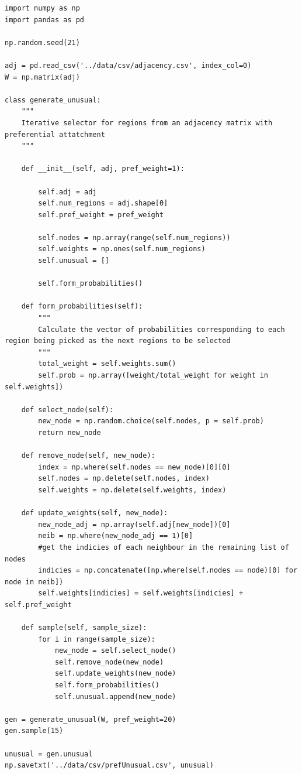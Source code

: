 \documentclass[11pt]{report}
\begin{document}
\begin{verbatim}
import numpy as np
import pandas as pd

np.random.seed(21)

adj = pd.read_csv('../data/csv/adjacency.csv', index_col=0)
W = np.matrix(adj)

class generate_unusual:
    """
    Iterative selector for regions from an adjacency matrix with preferential attatchment
    """
    
    def __init__(self, adj, pref_weight=1):

        self.adj = adj
        self.num_regions = adj.shape[0]
        self.pref_weight = pref_weight

        self.nodes = np.array(range(self.num_regions))
        self.weights = np.ones(self.num_regions)
        self.unusual = []

        self.form_probabilities()

    def form_probabilities(self):
        """
        Calculate the vector of probabilities corresponding to each region being picked as the next regions to be selected
        """
        total_weight = self.weights.sum()
        self.prob = np.array([weight/total_weight for weight in self.weights])

    def select_node(self):
        new_node = np.random.choice(self.nodes, p = self.prob)
        return new_node

    def remove_node(self, new_node):
        index = np.where(self.nodes == new_node)[0][0]
        self.nodes = np.delete(self.nodes, index)
        self.weights = np.delete(self.weights, index)

    def update_weights(self, new_node):
        new_node_adj = np.array(self.adj[new_node])[0]
        neib = np.where(new_node_adj == 1)[0]
        #get the indicies of each neighbour in the remaining list of nodes
        indicies = np.concatenate([np.where(self.nodes == node)[0] for node in neib]) 
        self.weights[indicies] = self.weights[indicies] + self.pref_weight

    def sample(self, sample_size):
        for i in range(sample_size):
            new_node = self.select_node()
            self.remove_node(new_node)
            self.update_weights(new_node)
            self.form_probabilities()
            self.unusual.append(new_node)

gen = generate_unusual(W, pref_weight=20)
gen.sample(15)

unusual = gen.unusual
np.savetxt('../data/csv/prefUnusual.csv', unusual)

\end{verbatim}

\printbibliography
\end{document}
